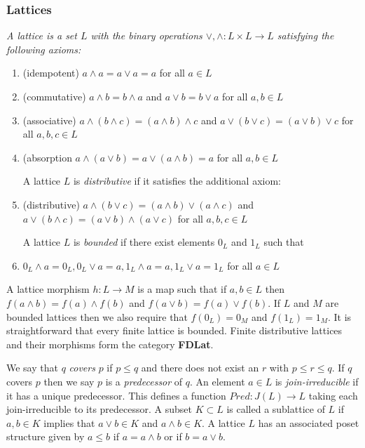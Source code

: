 \subsubsection{Lattices}

\begin{defn}
{\em
A {\em lattice} is a set $L$ with the binary operations $\vee,\wedge:L\times L\to L$ satisfying the following axioms:

\begin{enumerate}
\item (idempotent) $a\wedge a = a \vee a = a$ for all $a\in L$
\item (commutative) $a\wedge b = b\wedge a$ and $a\vee b = b \vee a$ for all $a,b\in L$
\item (associative) $a\wedge (b\wedge c) = (a\wedge b)\wedge c$ and $a\vee(b\vee c) = (a\vee b)\vee c$ for all $a,b,c\in L$
\item (absorption $a\wedge (a\vee b) = a\vee (a\wedge b)=a$ for all $a,b\in L$

A lattice $L$ is {\em distributive} if it satisfies the additional axiom:

\item (distributive) $a\wedge (b\vee c) = (a\wedge b)\vee (a\wedge c)$ and $a\vee (b\wedge c) = (a\vee b) \wedge (a\vee c)$ for all $a,b,c\in L$

A lattice $L$ is {\em bounded} if there exist elements $0_L$ and $1_L$ such that

\item $0_L\wedge a = 0_L, 0_L\vee a = a, 1_L\wedge a = a, 1_L\vee a = 1_L$ for all $a\in L$
\end{enumerate}
}
\end{defn}

A lattice morphism $h:L\to M$ is a map such that if $a,b\in L$ then $f(a\wedge b) = f(a)\wedge f(b)$ and $f(a\vee b) = f(a)\vee f(b)$.  If $L$ and $M$ are bounded lattices then we also require that $f(0_L)=0_M$ and $f(1_L)=1_M$.    It is straightforward that every finite lattice is bounded. Finite distributive lattices and their morphisms form the category {\bf FDLat}.

We say that $q$ {\em covers} $p$ if $p\leq q$ and there does not exist an $r$ with $p\leq r \leq q$.  If $q$ covers $p$ then we say $p$ is a {\em predecessor} of $q$.  An element $a\in L$ is {\em join-irreducible} if it has a unique predecessor.   This defines a function $Pred:J(L)\to L$ taking each join-irreducible to its predecessor.  A subset $K\subset L$ is called a sublattice of $L$ if $a,b\in K$ implies that $a\vee b\in K$ and $a\wedge b\in K$.  A lattice $L$ has an associated poset structure given by $a\leq b$ if $a=a\wedge b$ or if $b=a\vee b$.

